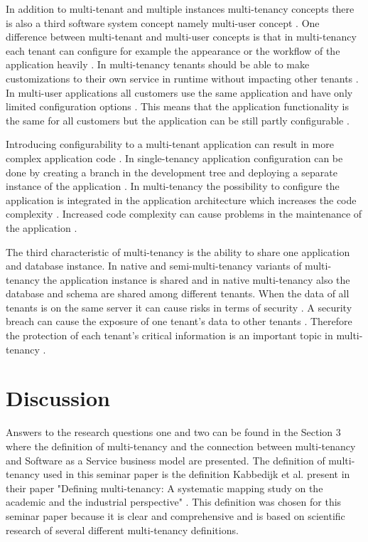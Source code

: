 \documentclass[conference]{sasmoota2017}
\begin{document}
In addition to multi-tenant and multiple instances multi-tenancy concepts there is also a third software system concept namely multi-user concept \cite{Bezemer:2010:MaintenanceDream}. One difference between multi-tenant and multi-user concepts is that in multi-tenancy each tenant can configure for example the appearance or the workflow of the application heavily \cite{Bezemer:2010:MaintenanceDream}. In multi-tenancy tenants should be able to make customizations to their own service in runtime without impacting other tenants \cite{Guo:2007:FrameworkForNative}. In multi-user applications all customers use the same application and have only limited configuration options \cite{Bezemer:2010:MaintenanceDream}. This means that the application functionality is the same for all customers but the application can be still partly configurable \cite{Kabbedijk2015:Defining}. 

Introducing configurability to a multi-tenant application can result in more complex application code \cite{Bezemer:2010:EnablingMultiTenancy}. In single-tenancy application configuration can be done by creating a branch in the development tree and deploying a separate instance of the application \cite{Bezemer:2010:MaintenanceDream}. In multi-tenancy the possibility to configure the application is integrated in the application architecture which increases the code complexity \cite{Bezemer:2010:MaintenanceDream}. Increased code complexity can cause problems in the maintenance of the application \cite{Bezemer:2010:MaintenanceDream}. 

The third characteristic of multi-tenancy is the ability to share one application and database instance. In native and semi-multi-tenancy variants of multi-tenancy the application instance is shared and in native multi-tenancy also the database and schema are shared among different tenants. When the data of all tenants is on the same server it can cause risks in terms of security \cite{Bezemer:2010:EnablingMultiTenancy}. A security breach can cause the exposure of one tenant's data to other tenants \cite{Bezemer:2010:MaintenanceDream}. Therefore the protection of each tenant's critical information is an important topic in multi-tenancy \cite{Guo:2007:FrameworkForNative}.



\section{Discussion}

Answers to the research questions one and two can be found in the Section 3 where the definition of multi-tenancy and the connection between multi-tenancy and Software as a Service business model are presented. The definition of multi-tenancy used in this seminar paper is the definition Kabbedijk et al. present in their paper "Defining multi-tenancy: A systematic mapping study on the academic and the industrial perspective" \cite{Kabbedijk2015:Defining}. This definition was chosen for this seminar paper because it is clear and comprehensive and is based on scientific research of several different multi-tenancy definitions.
\end{document}
